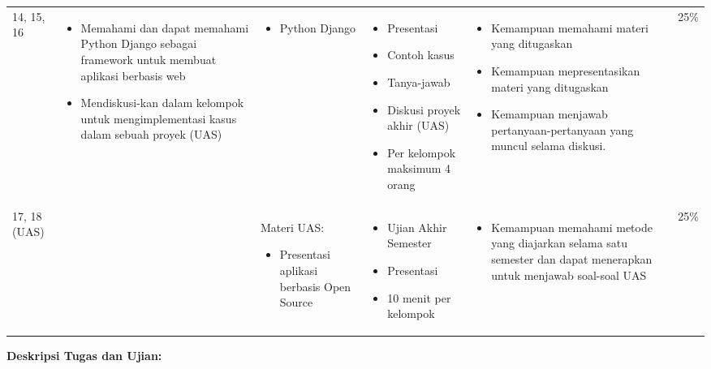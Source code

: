 \documentclass[11pt, a4paper]{article}
\newenvironment{myitemize}
{ \begin{itemize} [label={--},noitemsep,leftmargin=*,topsep=0pt,partopsep=0pt]  }
	{ \end{itemize}  }
\begin{document}
\begin{longtable}{p{1cm}P{3cm}P{3cm}P{3cm}P{3.5cm}P{1.5cm}}
14, 15, 16 & 
\begin{myitemize}
	\item 
	Memahami dan dapat memahami Python Django sebagai framework untuk membuat aplikasi berbasis web
	\item
	Mendiskusi-kan dalam kelompok untuk mengimplementasi kasus dalam sebuah proyek (UAS)
\end{myitemize} & 
\begin{myitemize}
	\item
	Python Django
\end{myitemize} & 
\begin{myitemize}
	\item
	Presentasi
	\item
	Contoh kasus
	\item
	Tanya-jawab
	\item
	Diskusi proyek akhir (UAS)
	\item
	Per kelompok maksimum 4 orang
\end{myitemize} & 
\begin{myitemize}
	\item
	Kemampuan memahami materi yang ditugaskan
	\item
	Kemampuan mepresentasikan materi yang ditugaskan
	\item
	Kemampuan menjawab pertanyaan-pertanyaan yang muncul selama diskusi.
\end{myitemize} &
25\%\\

17, 18 (UAS) & & Materi UAS:
\begin{myitemize}
	\item
	Presentasi aplikasi berbasis Open Source
\end{myitemize} & 
\begin{myitemize}
	\item
	Ujian Akhir Semester
	\item
	Presentasi
	\item
	10 menit per kelompok
\end{myitemize} & 
\begin{myitemize}
	\item
	Kemampuan memahami metode yang diajarkan selama satu semester dan dapat menerapkan untuk menjawab soal-soal UAS 
\end{myitemize} &
25\%\\

\bottomrule
\end{longtable}
\clearpage
\vspace*{.15in}
\noindent\textbf{Deskripsi Tugas dan Ujian:}
\end{document}
